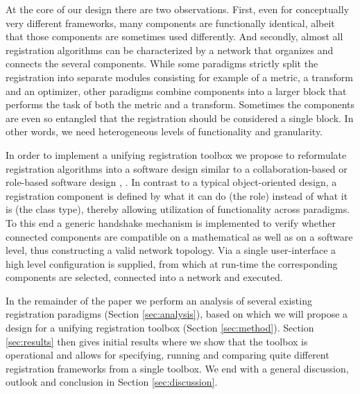 At the core of our design there are two observations. First, even for
conceptually very different frameworks, many components are
functionally identical, albeit that those components are sometimes
used differently. And secondly, almost all registration algorithms can be
characterized by a network that organizes and connects the several
components. While some paradigms strictly split the registration
into separate modules consisting for example of a metric, a
transform and an optimizer, other paradigms combine components into
a larger block that performs the task of both the metric and a
transform. Sometimes the components are even so entangled that the
registration should be considered a single block. In other words, we
need heterogeneous levels of functionality and granularity.

In order to implement a unifying registration toolbox we propose to
reformulate registration algorithms into a software design similar
to a collaboration-based or role-based software design \cite{VanHilst:Role}, \cite{Smaragdakis:Mixin}. In
contrast to a typical object-oriented design, a registration
component is defined by what it can do (the role) instead of what it is (the class type), thereby allowing utilization of functionality across
paradigms. To this end a generic handshake mechanism is implemented
to verify whether connected components are compatible on a
mathematical as well as on a software level, thus constructing a
valid network topology. Via a single user-interface a high level
configuration is supplied, from which at run-time the corresponding
components are selected, connected into a network and executed.

In the remainder of the paper we perform an analysis of several
existing registration paradigms (Section \ref{sec:analysis}), based
on which we will propose a design for a unifying registration
toolbox (Section \ref{sec:method}). Section \ref{sec:results} then gives initial results
where we show that the toolbox is operational and allows for
specifying, running and comparing quite different registration
frameworks from a single toolbox. We end with a general discussion,
outlook and conclusion in Section \ref{sec:discussion}.


